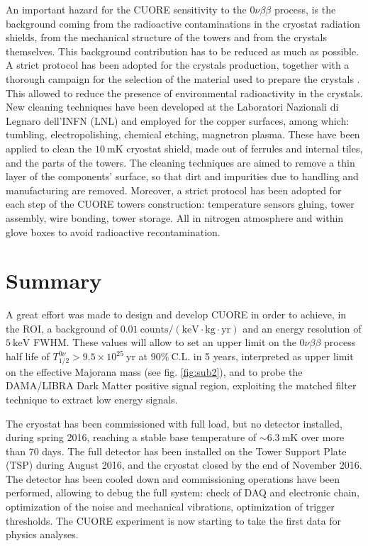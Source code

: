 \documentclass[12pt]{article}
\begin{document}
An important hazard for the CUORE sensitivity to the $0 \nu \beta \beta$ process, is the background coming from the radioactive contaminations in the cryostat radiation shields, from the mechanical structure of the towers and from the crystals themselves. This background contribution has to be reduced as much as possible. A strict protocol has been adopted for the crystals production, together with a thorough campaign for the selection of the material used to prepare the crystals \cite{crystclean}. This allowed to reduce the presence of environmental radioactivity in the crystals. New cleaning techniques have been developed at the Laboratori Nazionali di Legnaro dell'INFN (LNL) and employed for the copper surfaces, among which: tumbling, electropolishing, chemical etching, magnetron plasma. These have been applied to clean the $10~\mathrm{mK}$ cryostat shield, made out of ferrules and internal tiles, and the parts of the towers. The cleaning techniques are aimed to remove a thin layer of the components' surface, so that dirt and impurities due to handling and manufacturing are removed. Moreover, a strict protocol has been adopted for each step of the CUORE towers construction: temperature sensors gluing, tower assembly, wire bonding, tower storage. All in nitrogen atmosphere and within glove boxes to avoid radioactive recontamination.

\section{Summary}

A great effort was made to design and develop CUORE in order to achieve, in the ROI, a background of $0.01~\mathrm{counts/(keV\cdot kg\cdot yr)}$ and an energy resolution of $5~\mathrm{keV}$ FWHM. These values will allow to set an upper limit on the $0 \nu \beta \beta$ process half life of $T^{0\nu}_{1/2} > 9.5 \times 10^{25}~\mathrm{yr}$ at $90\%~\mathrm{C.L.}$ in 5 years, interpreted as upper limit on the effective Majorana mass (see fig. \ref{fig:sub2}), and to probe the DAMA/LIBRA Dark Matter positive signal region, exploiting the matched filter technique to extract low energy signals.

The cryostat has been commissioned with full load, but no detector installed, during spring 2016, reaching a stable base temperature of $\sim6.3~\mathrm{mK}$ over more than 70 days. The full detector has been installed on the Tower Support Plate (TSP) during August 2016, and the cryostat closed by the end of November 2016. The detector has been cooled down and commissioning operations have been performed, allowing to debug the full system: check of DAQ and electronic chain, optimization of the noise and mechanical vibrations, optimization of trigger thresholds. The CUORE experiment is now starting to take the first data for physics analyses.
\end{document}
